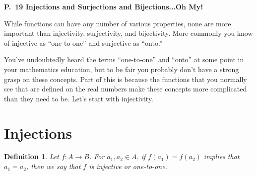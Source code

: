 \documentclass[12 pt]{article}
\theoremstyle{definition}
\theoremstyle{plain}
\theoremstyle{mytheorem}
\theoremstyle{myexample}
\theoremstyle{mydefinition}
\newtheorem*{definition*}{Definition}
\begin{document}
\begin{center}
\textbf{P.~19 Injections and Surjections and Bijections...Oh My!}
\end{center}

While functions can have any number of various properties, none are more important than injectivity, surjectivity, and bijectivity.  More commonly you know of injective as ``one-to-one'' and surjective as ``onto.''

\begin{center}
\end{center}

You've undoubtedly heard the terms ``one-to-one'' and ``onto'' at some point in your mathematics education, but to be fair you probably don't have a strong grasp on these concepts.  Part of this is because the functions that you normally see that are defined on the real numbers make these concepts more complicated than they need to be.  Let's start with injectivity.


\section{Injections}
\begin{definition*}  Let $f: A \to B$.  For $a_1,a_2 \in A$, if $f(a_1)=f(a_2)$ implies that $a_1=a_2$, then we say that $f$ is \textit{injective} or \textit{one-to-one}.
\end{definition*}
\end{document}
